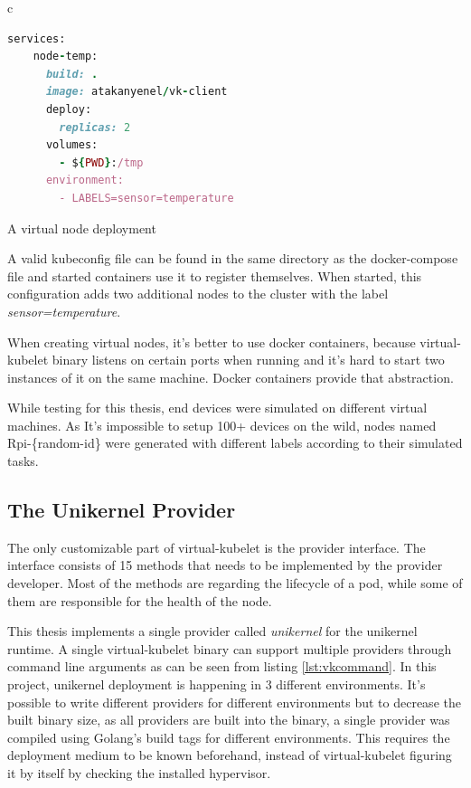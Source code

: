 \begin{code}[htpb]
  \centering
  \begin{tabular}{c}
  \begin{lstlisting}[language=ruby]
    services:
    node-temp:
      build: .
      image: atakanyenel/vk-client
      deploy:
        replicas: 2
      volumes:
        - ${PWD}:/tmp
      environment:
        - LABELS=sensor=temperature
\end{lstlisting}
\end{tabular}
\caption{A virtual node deployment}\label{fig:docker-compose}
\end{code}


A valid kubeconfig file can be found in the same directory as the docker-compose file and started containers use it to register themselves. When started, this configuration adds two additional nodes to the cluster with the label \textit{sensor=temperature}.

When creating virtual nodes, it's better to use docker containers, because virtual-kubelet binary listens on certain ports when running and it's hard to start two instances of it on the same machine. Docker containers provide that abstraction.

While testing for this thesis, end devices were simulated on different virtual machines. As It's impossible to setup 100+ devices on the wild, nodes named Rpi-\{random-id\} were generated with different labels according to their simulated tasks.

\subsection{The Unikernel Provider}
The only customizable part of virtual-kubelet is the provider interface. The interface consists of 15 methods that needs to be implemented by the provider developer. Most of the methods are regarding the lifecycle of a pod, while some of them are responsible for the health of the node. 

This thesis implements a single provider called \textit{unikernel} for the unikernel runtime. A single virtual-kubelet binary can support multiple providers through command line arguments as can be seen from listing \ref{lst:vkcommand}. In this project, unikernel deployment is happening in 3 different environments. It's possible to write different providers for different environments but to decrease the built binary size, as all providers are built into the binary, a single provider was compiled using Golang's build tags for different environments. This requires the deployment medium to be known beforehand, instead of virtual-kubelet figuring it by itself by checking the installed hypervisor.

